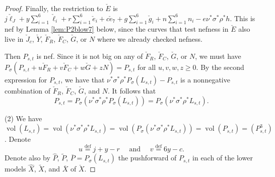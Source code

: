 \documentclass[12pt]{amsart}
\theoremstyle{definition}
\renewcommand{\geq}{\geqslant}
\DeclareMathOperator{\vol}{vol}
\newcommand{\deq}{\ensuremath{\stackrel{\textrm{def}}{=}}}
\newcommand{\?}{ \circled{{\large\bf ?}}}
\begin{document}
\begin{proof}
Finally, the restriction to $\check E$ is $j\check{\ell}_J+y\sum_{i=1}^6\check{\ell}_i+r\sum_{i=1}^6\check e_i+c\check e_7+g\sum_{i=1}^6\check g_i+n\sum_{i=1}^6n_i-e\nu^*\sigma^*\rho^*h$. This is nef by Lemma \ref{lem:P2blow7} below, since the curves that test nefness in $\check E$ also live in $\check J_c$, $\check Y$, $\check F_R$, $\check F_C$, $\check G$, or $N$ where we already checked nefness.

Then $P_{s,t}$ is nef. Since it is not big on any of $\check F_R$, $\check F_C$, $\check G$, or $N$, we must have $P_{\sigma}(P_{s,t}+u\check F_R+v\check F_C+w\check G+zN)=P_{s,t}$ for all $u,v,w,z\geq 0$. By the second expression for $P_{s,t}$, we have that $\nu^*\sigma^*\rho^*P_{\sigma}(L_{s,t})-P_{s,t}$ is a nonnegative combination of $\check F_R$, $\check F_C$, $\check G$, and $N$. It follows that
\[P_{s,t}=P_{\sigma}(\nu^*\sigma^*\rho^*P_{\sigma}(L_{s,t}))=P_{\sigma}(\nu^*\sigma^*\rho^*L_{s,t}).\]

(2) We have $\vol(L_{s,t})=\vol(\nu^*\sigma^*\rho^*L_{s,t})=\vol(P_{\sigma}(\nu^*\sigma^*\rho^*L_{s,t}))=\vol(P_{s,t})=(P_{s,t}^3)$. 
Denote 
\[u\deq j+y-r\quad\text{ and }\quad v\deq 6y-c.\]
Denote also by $\widehat P$, $\widetilde P$, $\overline P=P_{\sigma}(L_{s,t})$ the pushforward of $P_{s,t}$ in each of the lower models $\widehat X$, $\widetilde X$, and $\overline X$ of $\check X$. 


\end{proof}
\end{document}
